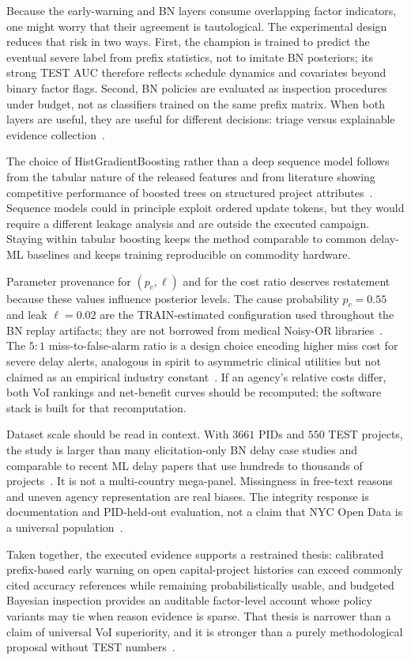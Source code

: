 Because the early-warning and BN layers consume overlapping factor indicators, one might worry that their agreement is tautological. The experimental design reduces that risk in two ways. First, the champion is trained to predict the eventual severe label from prefix statistics, not to imitate BN posteriors; its strong TEST AUC therefore reflects schedule dynamics and covariates beyond binary factor flags. Second, BN policies are evaluated as inspection procedures under budget, not as classifiers trained on the same prefix matrix. When both layers are useful, they are useful for different decisions: triage versus explainable evidence collection~\cite{Egwim2021,Luu2009,Memarzadeh2016}.

The choice of HistGradientBoosting rather than a deep sequence model follows from the tabular nature of the released features and from literature showing competitive performance of boosted trees on structured project attributes~\cite{Egwim2021,Friedman2001,Tagharobi2025}. Sequence models could in principle exploit ordered update tokens, but they would require a different leakage analysis and are outside the executed campaign. Staying within tabular boosting keeps the method comparable to common delay-ML baselines and keeps training reproducible on commodity hardware.

Parameter provenance for $(p_c,\ell)$ and for the cost ratio deserves restatement because these values influence posterior levels. The cause probability $p_c{=}0.55$ and leak $\ell{=}0.02$ are the TRAIN-estimated configuration used throughout the BN replay artifacts; they are not borrowed from medical Noisy-OR libraries~\cite{Onisko2001,Heckerman1996}. The $5{:}1$ miss-to-false-alarm ratio is a design choice encoding higher miss cost for severe delay alerts, analogous in spirit to asymmetric clinical utilities but not claimed as an empirical industry constant~\cite{Vickers2006,Howard1966}. If an agency’s relative costs differ, both VoI rankings and net-benefit curves should be recomputed; the software stack is built for that recomputation.

Dataset scale should be read in context. With $3661$ PIDs and $550$ TEST projects, the study is larger than many elicitation-only BN delay case studies and comparable to recent ML delay papers that use hundreds to thousands of projects~\cite{Khodabakhshian2025,Egwim2021,Tagharobi2025}. It is not a multi-country mega-panel. Missingness in free-text reasons and uneven agency representation are real biases. The integrity response is documentation and PID-held-out evaluation, not a claim that NYC Open Data is a universal population~\cite{Woldesenbet2016,Flyvbjerg2009}.

Taken together, the executed evidence supports a restrained thesis: calibrated prefix-based early warning on open capital-project histories can exceed commonly cited accuracy references while remaining probabilistically usable, and budgeted Bayesian inspection provides an auditable factor-level account whose policy variants may tie when reason evidence is sparse. That thesis is narrower than a claim of universal VoI superiority, and it is stronger than a purely methodological proposal without TEST numbers~\cite{Song2021,Gneiting2007,Luu2009,Tagharobi2025}.
